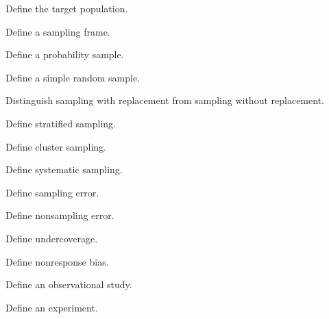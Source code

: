 \begin{exercise}[1]
Define the target population.
\end{exercise}

\begin{exercise}[1]
Define a sampling frame.
\end{exercise}

\begin{exercise}[1]
Define a probability sample.
\end{exercise}

\begin{exercise}[1]
Define a simple random sample.
\end{exercise}

\begin{exercise}[1]
Distinguish sampling with replacement from sampling without replacement.
\end{exercise}

\begin{exercise}[1]
Define stratified sampling.
\end{exercise}

\begin{exercise}[1]
Define cluster sampling.
\end{exercise}

\begin{exercise}[1]
Define systematic sampling.
\end{exercise}

\begin{exercise}[1]
Define sampling error.
\end{exercise}

\begin{exercise}[1]
Define nonsampling error.
\end{exercise}

\begin{exercise}[1]
Define undercoverage.
\end{exercise}

\begin{exercise}[1]
Define nonresponse bias.
\end{exercise}

\begin{exercise}[1]
Define an observational study.
\end{exercise}

\begin{exercise}[1]
Define an experiment.
\end{exercise}

